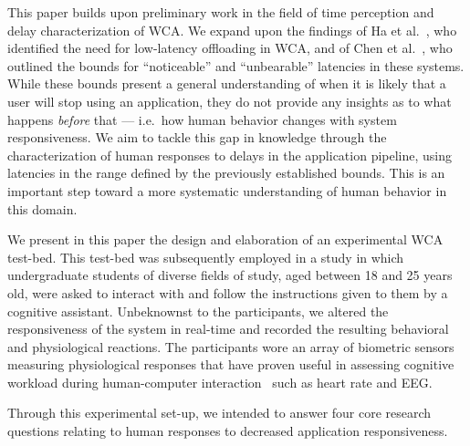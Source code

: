 \documentclass[10pt,letterpaper]{article}
\providecommand{\DIFaddtex}[1]{#1} %
\providecommand{\DIFdeltex}[1]{} %
\providecommand{\DIFaddbegin}{\protect\color{blue}} %
\providecommand{\DIFaddend}{\protect\color{black}} %
\providecommand{\DIFdelbegin}{\protect\color{red}} %
\providecommand{\DIFdelend}{\protect\color{black}} %
\providecommand{\DIFadd}[1]{\texorpdfstring{\DIFaddtex{#1}}{#1}} %
\providecommand{\DIFdel}[1]{\texorpdfstring{\DIFdeltex{#1}}{}} %
\newcommand{\DIFscaledelfig}{0.5}
\newlength{\DIFdelgraphicswidth} %
\newlength{\DIFdelgraphicsheight} %
\newcommand{\DIFaddincludegraphics}[2][]{{\color{blue}\fbox{\DIFOincludegraphics[#1]{#2}}}} %
\newcommand{\DIFdelincludegraphics}[2][]{%
\sbox{\DIFdelgraphicsbox}{\DIFOincludegraphics[#1]{#2}}%
\settoboxwidth{\DIFdelgraphicswidth}{\DIFdelgraphicsbox} %
\settoboxtotalheight{\DIFdelgraphicsheight}{\DIFdelgraphicsbox} %
\scalebox{\DIFscaledelfig}{%
\parbox[b]{\DIFdelgraphicswidth}{\usebox{\DIFdelgraphicsbox}\\[-\baselineskip] \rule{\DIFdelgraphicswidth}{0em}}\llap{\resizebox{\DIFdelgraphicswidth}{\DIFdelgraphicsheight}{%
\setlength{\unitlength}{\DIFdelgraphicswidth}%
\begin{picture}(1,1)%
\thicklines\linethickness{2pt} %
{\color[rgb]{1,0,0}\put(0,0){\framebox(1,1){}}}%
{\color[rgb]{1,0,0}\put(0,0){\line( 1,1){1}}}%
{\color[rgb]{1,0,0}\put(0,1){\line(1,-1){1}}}%
\end{picture}%
}\hspace*{3pt}}} %
} %
\DeclareRobustCommand{\DIFaddbegin}{\DIFOaddbegin \let\includegraphics\DIFaddincludegraphics} %
\DeclareRobustCommand{\DIFaddend}{\DIFOaddend \let\includegraphics\DIFOincludegraphics} %
\DeclareRobustCommand{\DIFdelbegin}{\DIFOdelbegin \let\includegraphics\DIFdelincludegraphics} %
\DeclareRobustCommand{\DIFdelend}{\DIFOaddend \let\includegraphics\DIFOincludegraphics} %
\begin{document}
This paper builds upon preliminary work in the field of time perception and delay characterization of WCA.\@
We expand upon the findings of Ha et al.~\cite{Ha:TowardsWearableCogAssist}, who identified the need for low-latency offloading in WCA, and of Chen et al.~\cite{Chen:AnEmpiricalStudyOfLatency}, who outlined the bounds for ``noticeable'' and ``unbearable'' latencies in these systems.
While these bounds present a general understanding of when it is likely that a user will \DIFdelbegin \DIFdel{drop }\DIFdelend \DIFaddbegin \DIFadd{stop using }\DIFaddend an application, they do not provide any insights as to what happens \emph{before} that --- i.e.\DIFaddbegin \DIFadd{\ }\DIFaddend how human behavior changes with system responsiveness.
We aim to tackle this \DIFdelbegin \DIFdel{question }\DIFdelend \DIFaddbegin \DIFadd{gap in knowledge }\DIFaddend through the characterization of human responses to delays in the application pipeline, using latencies in the range defined by the previously established bounds.
This is an important step toward a more systematic understanding of human behavior in this domain.

We present in this paper \DIFaddbegin \DIFadd{the design and elaboration of }\DIFaddend an experimental WCA test-bed\DIFdelbegin \DIFdel{of our design and making}\DIFdelend .
This test-bed was subsequently employed in a study in which undergraduate students \DIFaddbegin \DIFadd{of diverse fields of study, aged between 18 and 25 years old, }\DIFaddend were asked to interact with and follow the instructions given to them by a cognitive assistant.
Unbeknownst to the participants, we altered the responsiveness of the system in real-time and recorded the resulting behavioral and physiological reactions. 
The participants wore an array of biometric sensors measuring physiological responses that have proven useful in assessing cognitive workload during human-computer interaction~\cite{haapalainen2010psycho,kumar2016measurement} such as heart rate and EEG.\@

\DIFdelbegin \DIFdel{Our results indicate that reduced responsiveness in WCA systems leads to a disruption of participants' cognitive plan for the task.
This is evidenced by an emergent pacing effect on user actions as system responsiveness is reduced.
While it would seem self-evident that users take longer to complete a task while using a system with low responsiveness --- as they have to wait longer for new instructions --- our study found that user slow-down represents a source of substantial additional delay.
To be more precise, the data indicate that users slow down not only because they have to wait for the system to catch up, but that their reactions to new instructions is also delayed.
Furthermore, this effect persists for a while after system response improves and is modulated by intrinsic personality traits, in particular, \emph{neuroticism}~}%
\DIFdel{, which has previously been connected to intolerance for time delay~}%
\DIFdel{. 
}\DIFdelend \DIFaddbegin \DIFadd{Through this experimental set-up, we intended to answer four core research questions relating to human responses to decreased application responsiveness.
}\DIFaddend 
\end{document}
